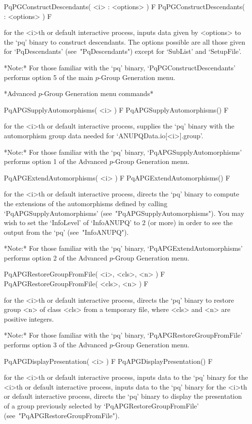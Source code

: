 \>PqPGConstructDescendants( <i> : <options> ) F
\>PqPGConstructDescendants( : <options> ) F

for the <i>th or default interactive {\ANUPQ} process, inputs data  given
by <options> to the `pq' binary to  construct  descendants.  The  options
possible are all those given  for  `PqDescendants'  (see~"PqDescendants")
except for `SubList' and `SetupFile'.

*Note:* 
For those  familiar  with  the  `pq'  binary,  `PqPGConstructDescendants'
performs option 5 of the main $p$-Group Generation menu.

*Advanced $p$-Group Generation menu commands*

\>PqAPGSupplyAutomorphisms( <i> ) F
\>PqAPGSupplyAutomorphisms() F

for the <i>th or default interactive {\ANUPQ} process, supplies the  `pq'
binary    with    the    automorphism    group    data     needed     for
`ANUPQData.io[<i>].group'.

*Note:*
For those  familiar  with  the  `pq'  binary,  `PqAPGSupplyAutomorphisms'
performs option 1 of the Advanced $p$-Group Generation menu.

\>PqAPGExtendAutomorphisms( <i> ) F
\>PqAPGExtendAutomorphisms() F

for the <i>th or default interactive {\ANUPQ} process, directs  the  `pq'
binary to compute the extensions of the automorphisms defined by  calling
`PqAPGSupplyAutomorphisms' (see~"PqAPGSupplyAutomorphisms"). You may wish
to set the `InfoLevel' of `InfoANUPQ' to 2 (or more) in order to see  the
output from the `pq' (see~"InfoANUPQ").

*Note:*
For  those  familiar  with  the  `pq'  binary, `PqAPGExtendAutomorphisms'
performs option 2 of the Advanced $p$-Group Generation menu.

\>PqAPGRestoreGroupFromFile( <i>, <cls>, <n> ) F
\>PqAPGRestoreGroupFromFile( <cls>, <n> ) F

for the <i>th or default interactive {\ANUPQ} process, directs  the  `pq'
binary to restore group <n> of class <cls> from a temporary  file,  where
<cls> and <n> are positive integers.

*Note:*
For those familiar  with  the  `pq'  binary,  `PqAPGRestoreGroupFromFile'
performs option 3 of the Advanced $p$-Group Generation menu.

\>PqAPGDisplayPresentation( <i> ) F
\>PqAPGDisplayPresentation() F

for the <i>th or default interactive {\ANUPQ} process, inputs data to the
`pq' binary for the <i>th or default interactive {\ANUPQ} process, inputs
data to the `pq' binary for the <i>th  or  default  interactive  {\ANUPQ}
process, directs the `pq' binary to display the presentation of  a  group
previously        selected         by         `PqAPGRestoreGroupFromFile'
(see~"PqAPGRestoreGroupFromFile").

